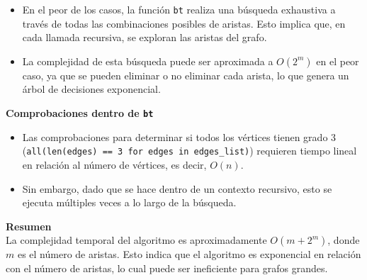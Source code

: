 \documentclass[
10pt, %
a4paper, %
oneside, %
headinclude,footinclude, %
BCOR5mm, %
]{scrartcl}
\begin{document}
\begin{itemize}
    \item En el peor de los casos, la función \texttt{bt} realiza una búsqueda exhaustiva a través de todas las combinaciones posibles de aristas. Esto implica que, en cada llamada recursiva, se exploran las aristas del grafo.
    \item La complejidad de esta búsqueda puede ser aproximada a \( O(2^m) \) en el peor caso, ya que se pueden eliminar o no eliminar cada arista, lo que genera un árbol de decisiones exponencial.
\end{itemize}


\textbf{Comprobaciones dentro de \texttt{bt}}\\

\begin{itemize}
    \item Las comprobaciones para determinar si todos los vértices tienen grado 3 (\texttt{all(len(edges) == 3 for edges in edges\_list)}) requieren tiempo lineal en relación al número de vértices, es decir, \( O(n) \).
    \item Sin embargo, dado que se hace dentro de un contexto recursivo, esto se ejecuta múltiples veces a lo largo de la búsqueda.
\end{itemize}


\textbf{Resumen}\\
La complejidad temporal del algoritmo es aproximadamente \( O(m + 2^m) \), donde \( m \) es el número de aristas. Esto indica que el algoritmo es exponencial en relación con el número de aristas, lo cual puede ser ineficiente para grafos grandes.

\renewcommand{\refname}{\spacedlowsmallcaps{References}} %




\end{document}
